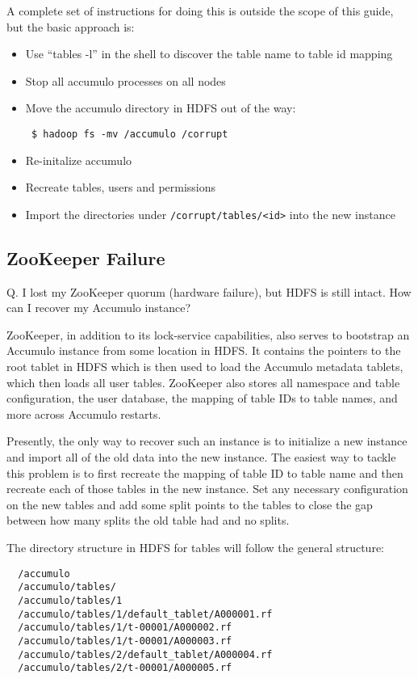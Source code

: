 A complete set of instructions for doing this is outside the scope of this guide,
but the basic approach is:

\begin{itemize}
 \item Use ``tables -l'' in the shell to discover the table name to table id mapping
 \item Stop all accumulo processes on all nodes
 \item Move the accumulo directory in HDFS out of the way:
\small
\begin{verbatim}
 $ hadoop fs -mv /accumulo /corrupt
\end{verbatim}
\normalsize
 \item Re-initalize accumulo
 \item Recreate tables, users and permissions
 \item Import the directories under \texttt{/corrupt/tables/<id>} into the new instance
\end{itemize}


\subsection{ZooKeeper Failure}
Q. I lost my ZooKeeper quorum (hardware failure), but HDFS is still intact. How can I recover my Accumulo instance?

ZooKeeper, in addition to its lock-service capabilities, also serves to bootstrap an Accumulo
instance from some location in HDFS. It contains the pointers to the root tablet in HDFS which
is then used to load the Accumulo metadata tablets, which then loads all user tables. ZooKeeper
also stores all namespace and table configuration, the user database, the mapping of table IDs to 
table names, and more across Accumulo restarts.

Presently, the only way to recover such an instance is to initialize a new instance and import all
of the old data into the new instance. The easiest way to tackle this problem is to first recreate
the mapping of table ID to table name and then recreate each of those tables in the new instance. 
Set any necessary configuration on the new tables and add some split points to the tables to close 
the gap between how many splits the old table had and no splits.

The directory structure in HDFS for tables will follow the general structure:

\small
\begin{verbatim}
  /accumulo
  /accumulo/tables/
  /accumulo/tables/1
  /accumulo/tables/1/default_tablet/A000001.rf
  /accumulo/tables/1/t-00001/A000002.rf
  /accumulo/tables/1/t-00001/A000003.rf
  /accumulo/tables/2/default_tablet/A000004.rf
  /accumulo/tables/2/t-00001/A000005.rf
\end{verbatim}
\normalsize

